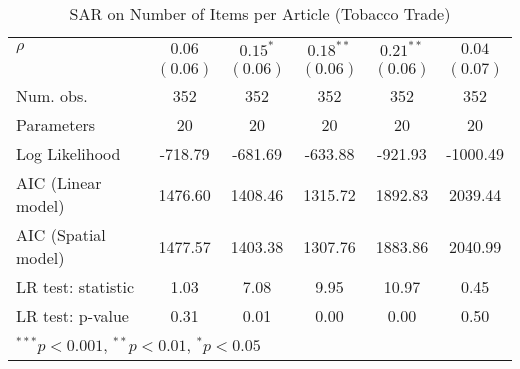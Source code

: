 \begin{table}[!h]
\begin{center}
\begin{tabular}{l c c c c c }
$\rho$                  & $0.06$       & $0.15^{*}$   & $0.18^{**}$  & $0.21^{**}$  & $0.04$       \\
                        & $(0.06)$     & $(0.06)$     & $(0.06)$     & $(0.06)$     & $(0.07)$     \\
\midrule
Num. obs.               & 352          & 352          & 352          & 352          & 352          \\
Parameters              & 20           & 20           & 20           & 20           & 20           \\
Log Likelihood          & -718.79      & -681.69      & -633.88      & -921.93      & -1000.49     \\
AIC (Linear model)      & 1476.60      & 1408.46      & 1315.72      & 1892.83      & 2039.44      \\
AIC (Spatial model)     & 1477.57      & 1403.38      & 1307.76      & 1883.86      & 2040.99      \\
LR test: statistic      & 1.03         & 7.08         & 9.95         & 10.97        & 0.45         \\
LR test: p-value        & 0.31         & 0.01         & 0.00         & 0.00         & 0.50         \\
\bottomrule
\multicolumn{6}{l}{\scriptsize{$^{***}p<0.001$, $^{**}p<0.01$, $^*p<0.05$}}
\end{tabular}
\caption{SAR on Number of Items per Article (Tobacco Trade)}
\label{table:coefficients}
\end{center}
\end{table}

